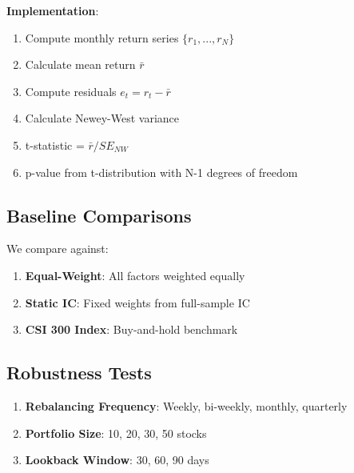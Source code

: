 \textbf{Implementation}:
\begin{enumerate}
    \item Compute monthly return series $\{r_1, ..., r_N\}$
    \item Calculate mean return $\bar{r}$
    \item Compute residuals $e_t = r_t - \bar{r}$
    \item Calculate Newey-West variance
    \item t-statistic = $\bar{r} / SE_{NW}$
    \item p-value from t-distribution with N-1 degrees of freedom
\end{enumerate}

\subsection{Baseline Comparisons}

We compare against:

\begin{enumerate}
    \item \textbf{Equal-Weight}: All factors weighted equally
    \item \textbf{Static IC}: Fixed weights from full-sample IC
    \item \textbf{CSI 300 Index}: Buy-and-hold benchmark
\end{enumerate}

\subsection{Robustness Tests}

\begin{enumerate}
    \item \textbf{Rebalancing Frequency}: Weekly, bi-weekly, monthly, quarterly
    \item \textbf{Portfolio Size}: 10, 20, 30, 50 stocks
    \item \textbf{Lookback Window}: 30, 60, 90 days
\end{enumerate}